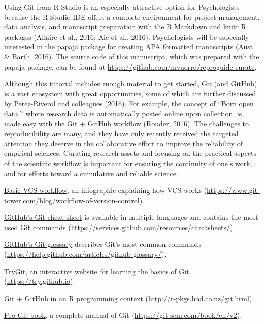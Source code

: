 \documentclass[
  american,
  ,doc,floatsintext]{apa6}
\begin{document}
Using Git from R Studio is an especially attractive option for Psychologists because the R Studio IDE offers a complete environment for project management, data analysis, and manuscript preparation with the R Markdown and knitr R packages (Allaire et al., 2016; Xie et al., 2016). Psychologists will be especially interested in the papaja package for creating APA formatted manuscripts (Aust \& Barth, 2016). The source code of this manuscript, which was prepared with the papaja package, can be found at \url{https://github.com/mvuorre/reproguide-curate}.

Although this tutorial includes enough material to get started, Git (and GitHub) is a vast ecosystem with great opportunities, some of which are further discussed by Perez-Riverol and colleagues (2016). For example, the concept of ``Born open data,'' where research data is automatically posted online upon collection, is made easy with the Git + GitHub workflow (Rouder, 2016). The challenges to reproducibility are many, and they have only recently received the targeted attention they deserve in the collaborative effort to improve the reliability of empirical sciences. Curating research assets and focusing on the practical aspects of the scientific workflow is important for ensuring the continuity of one's work, and for efforts toward a cumulative and reliable science.

\begin{tcolorbox}[colframe=green!50!black, colback=green!5, fonttitle=\small\bfseries, fontupper=\small, title=Box 4. Further resources for learning Git]
\begin{compactitem}
    \item \href{https://www.git-tower.com/blog/workflow-of-version-control}{Basic VCS workflow}, an infographic explaining how VCS works (\url{https://www.git-tower.com/blog/workflow-of-version-control}).
    \item \href{https://services.github.com/resources/cheatsheets/}{GitHub's Git cheat sheet} is available in multiple languages and contains the most used Git commands (\url{https://services.github.com/resources/cheatsheets/}).
\item \href{https://help.github.com/articles/github-glossary/}{GitHub's Git glossary} describes Git's most common commands (\url{https://help.github.com/articles/github-glossary/}).
    \item \href{https://try.github.io}{TryGit}, an interactive website for learning the basics of Git (\url{https://try.github.io}).
    \item \href{http://r-pkgs.had.co.nz/git.html}{Git + GitHub} in an R programming context (\url{http://r-pkgs.had.co.nz/git.html}).
    \item \href{https://git-scm.com/book/en/v2}{Pro Git book}, a complete manual of Git (\url{https://git-scm.com/book/en/v2}).
\end{compactitem}
\end{tcolorbox}
\end{document}
